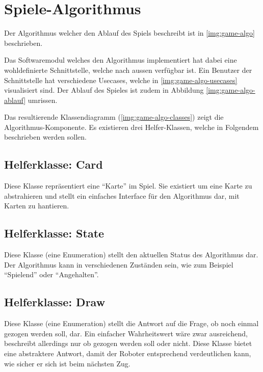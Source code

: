 \chapter{Spiele-Algorithmus}

    Der Algorithmus welcher den Ablauf des Spiels beschreibt ist in
    \ref{img:game-algo} beschrieben.

    Das Softwaremodul welches den Algorithmus implementiert hat dabei eine
    wohldefinierte Schnittstelle, welche nach aussen verfügbar ist.
    Ein Benutzer der Schnittstelle hat verschiedene Usecases, welche in
    \ref{img:game-algo-usecases} visualisiert sind.
    Der Ablauf des Spieles ist zudem in Abbildung \ref{img:game-algo-ablauf}
    umrissen.

    Das resultierende Klassendiagramm (\ref{img:game-algo-classes}) zeigt die
    Algorithmus-Komponente.
    Es existieren drei Helfer-Klassen, welche in Folgendem beschrieben werden
    sollen.

    \section{Helferklasse: Card}

        Diese Klasse repräsentiert eine ``Karte'' im Spiel.
        Sie existiert um eine Karte zu abstrahieren und stellt ein einfaches
        Interface für den Algorithmus dar, mit Karten zu hantieren.

    \section{Helferklasse: State}

        Diese Klasse (eine Enumeration) stellt den aktuellen Status des
        Algorithmus dar.
        Der Algorithmus kann in verschiedenen Zuständen sein, wie zum Beispiel
        ``Spielend'' oder ``Angehalten''.

    \section{Helferklasse: Draw}

        Diese Klasse (eine Enumeration) stellt die Antwort auf die Frage, ob
        noch einmal gezogen werden soll, dar.
        Ein einfacher Wahrheitswert wäre zwar ausreichend, beschreibt allerdings
        nur ob gezogen werden soll oder nicht.
        Diese Klasse bietet eine abstraktere Antwort, damit der Roboter
        entsprechend verdeutlichen kann, wie sicher er sich ist beim nächsten
        Zug.


